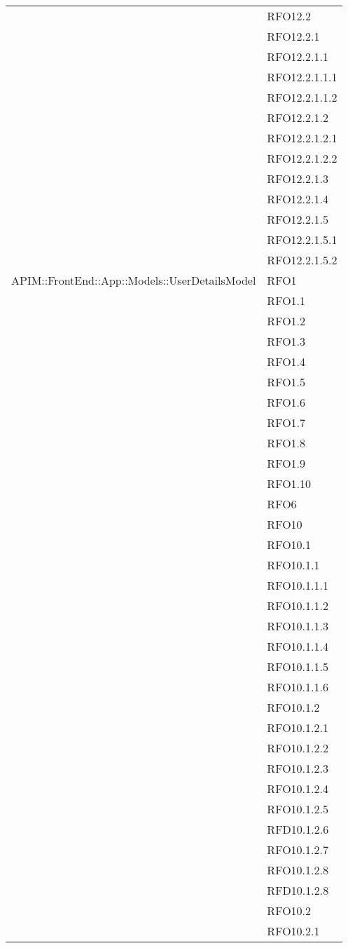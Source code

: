 \begin{longtable}{ p{12cm} | p{4cm} }
	& RFO12.2 \\
	& RFO12.2.1 \\
	& RFO12.2.1.1 \\
	& RFO12.2.1.1.1 \\
	& RFO12.2.1.1.2 \\
	& RFO12.2.1.2 \\
	& RFO12.2.1.2.1 \\
	& RFO12.2.1.2.2 \\
	& RFO12.2.1.3 \\
	& RFO12.2.1.4 \\
	& RFO12.2.1.5 \\
	& RFO12.2.1.5.1 \\
	& RFO12.2.1.5.2 \\
	\hline
	APIM::FrontEnd::App::Models::UserDetailsModel
	& RFO1 \\
	& RFO1.1 \\
	& RFO1.2 \\
	& RFO1.3 \\
	& RFO1.4 \\
	& RFO1.5 \\
	& RFO1.6 \\
	& RFO1.7 \\
	& RFO1.8 \\
	& RFO1.9 \\
	& RFO1.10 \\
	& RFO6 \\
	& RFO10 \\
	& RFO10.1 \\
	& RFO10.1.1 \\
	& RFO10.1.1.1 \\
	& RFO10.1.1.2 \\
	& RFO10.1.1.3 \\
	& RFO10.1.1.4 \\
	& RFO10.1.1.5 \\
	& RFO10.1.1.6 \\
	& RFO10.1.2 \\
	& RFO10.1.2.1 \\
	& RFO10.1.2.2 \\
	& RFO10.1.2.3 \\
	& RFO10.1.2.4 \\
	& RFO10.1.2.5 \\
	& RFD10.1.2.6 \\
	& RFO10.1.2.7 \\
	& RFO10.1.2.8 \\
	& RFD10.1.2.8 \\
	& RFO10.2 \\
	& RFO10.2.1 \\

\end{longtable}
